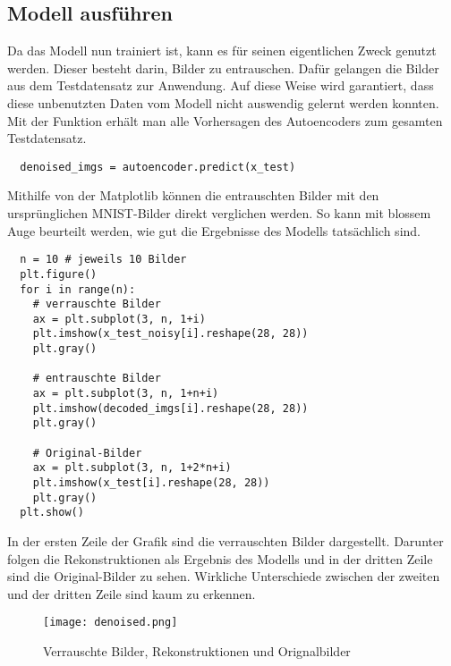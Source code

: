 \subsection{Modell ausführen}
Da das Modell nun trainiert ist, kann es für seinen eigentlichen Zweck
genutzt werden.
Dieser besteht darin, Bilder zu entrauschen. Dafür gelangen die
Bilder aus dem Testdatensatz zur Anwendung. Auf diese Weise wird garantiert, dass diese
unbenutzten Daten vom Modell nicht auswendig gelernt werden konnten.
Mit der Funktion 
erhält man alle Vorhersagen des Autoencoders zum gesamten Testdatensatz.
\begin{verbatim}
  denoised_imgs = autoencoder.predict(x_test)
\end{verbatim}
Mithilfe von der Matplotlib können die entrauschten Bilder mit den
ursprünglichen MNIST-Bilder direkt verglichen werden.
So kann mit blossem Auge beurteilt werden, wie gut die Ergebnisse des Modells tatsächlich sind.
\begin{verbatim}
  n = 10 # jeweils 10 Bilder
  plt.figure()
  for i in range(n):
    # verrauschte Bilder
    ax = plt.subplot(3, n, 1+i)
    plt.imshow(x_test_noisy[i].reshape(28, 28))
    plt.gray()

    # entrauschte Bilder
    ax = plt.subplot(3, n, 1+n+i)
    plt.imshow(decoded_imgs[i].reshape(28, 28))
    plt.gray()

    # Original-Bilder
    ax = plt.subplot(3, n, 1+2*n+i)
    plt.imshow(x_test[i].reshape(28, 28))
    plt.gray()
  plt.show()
\end{verbatim}
In der ersten Zeile der Grafik sind die verrauschten Bilder dargestellt.
Darunter folgen die Rekonstruktionen als Ergebnis des Modells und in der dritten Zeile
sind die Original-Bilder zu sehen.
Wirkliche Unterschiede zwischen der zweiten und der dritten Zeile sind kaum zu erkennen.
\begin{figure}[h!]
  \centering
  \texttt{[image: denoised.png]}
  \caption{Verrauschte Bilder, Rekonstruktionen und Orignalbilder}
\end{figure}

